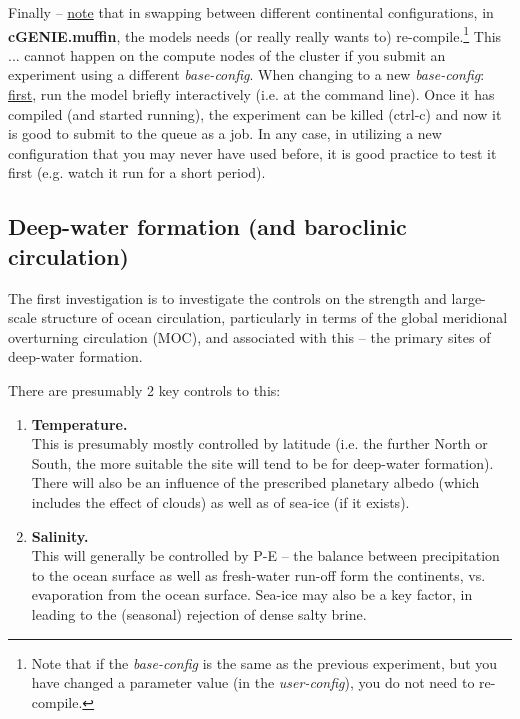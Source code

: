 \documentclass[11pt,fleqn]{book} %
\begin{document}
Finally -- \uline{note} that in swapping between different continental configurations, in \textbf{cGENIE.muffin}, the models needs (or really really wants to) re-compile.\footnote{Note that if the \textit{base-config} is the same as the previous experiment, but you have changed a parameter value (in the \textit{user-config}), you do not need to re-compile.} This ... cannot happen on the compute nodes of the cluster if you submit an experiment using a different \textit{base-config}. When changing to a new \textit{base-config}: \uline{first}, run the model briefly interactively (i.e. at the command line). Once it has compiled (and started running), the experiment can be killed (\textsf{ctrl-c}) and now it is good to submit to the queue as a job. In any case, in utilizing a new configuration that you may never have used before, it is good practice to test it first (e.g. watch it run for a short period).


\subsection{Deep-water formation (and baroclinic circulation)}

The first investigation is to investigate the controls on the strength and large-scale structure of ocean circulation, particularly in terms of the global meridional overturning circulation (MOC), and associated with this -- the primary sites of deep-water formation.

There are presumably 2 key controls to this:

\vspace{2mm}
\begin{enumerate}
\item \textbf{Temperature.}
\\This is presumably mostly controlled by latitude (i.e. the further North or South, the more suitable the site will tend to be for deep-water formation). There will also be an influence of the prescribed planetary albedo (which includes the effect of clouds) as well as of sea-ice (if it exists).
\vspace{2mm}
\item \textbf{Salinity.}
\\This will generally be controlled by P-E -- the balance between precipitation to the ocean surface as well as fresh-water run-off form the continents, vs. evaporation from the ocean surface. Sea-ice may also be a key factor, in leading to the (seasonal) rejection of dense salty brine.
\end{enumerate}
\vspace{2mm}
\end{document}
